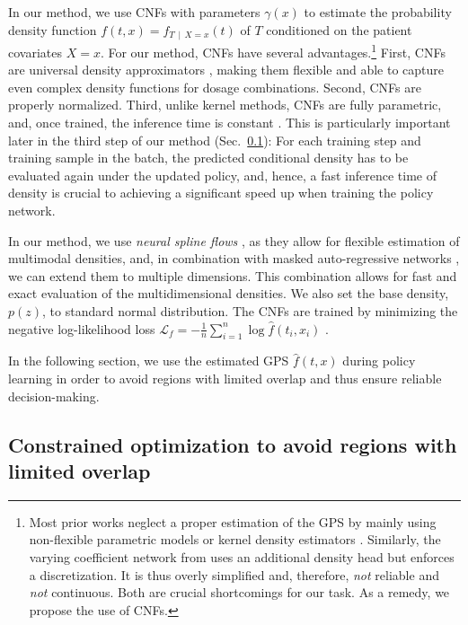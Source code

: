 \documentclass{article}
\theoremstyle{definition}
\theoremstyle{plain}
\begin{document}
In our method, we use CNFs with parameters $\gamma(x)$ to estimate the probability density function $f(t, x) = f_{T\,\mid\,X=x}(t)$ of $T$ conditioned on the patient covariates $X=x$. For our method, CNFs have several advantages.\footnote{Most prior works neglect a proper estimation of the GPS by mainly using non-flexible parametric models \cite{Hirano.2004} or kernel density estimators \cite{Kallus.2018e}. Similarly, the varying coefficient network from \cite{Nie.2021} uses an additional density head but enforces a discretization. It is thus overly simplified and, therefore, \emph{not} reliable and \emph{not} continuous. Both are crucial shortcomings for our task. As a remedy, we propose the use of CNFs.} First, CNFs are universal density approximators \cite{dinh2014nice, dinh2017density, durkan2019neural, huang2018neural}, making them flexible and able to capture even complex density functions for dosage combinations. Second, CNFs are properly normalized. Third, unlike kernel methods, CNFs are fully parametric, and, once trained, the inference time is constant \cite{Melnychuk.2022b}. This is particularly important later in the third step of our method (Sec.~\ref{sec:reliablepolicy}): For each training step and training sample in the batch, the predicted conditional density has to be evaluated again under the updated policy, and, hence, a fast inference time of density is crucial to achieving a significant speed up when training the policy network.

In our method, we use \emph{neural spline flows} \cite{durkan2019neural}, as they allow for flexible estimation of multimodal densities, and, in combination with masked auto-regressive networks \cite{dolatabadi2020invertible}, we can extend them to multiple dimensions. This combination allows for fast and exact evaluation of the multidimensional densities.  We also set the base density, $p(z)$, to standard normal distribution. 
The CNFs are trained by minimizing the negative log-likelihood loss
   $ \mathcal{L}_{f}= - \frac{1}{n}\sum_{i=1}^n  \log  \hat{f}(t_i, x_i)$ .

In the following section, we use the estimated GPS $\hat{f}(t,x)$ during policy learning in order to avoid regions with limited overlap and thus ensure reliable decision-making. 

\subsection{Constrained optimization to avoid regions with limited overlap} 
\label{sec:reliablepolicy}
\end{document}
